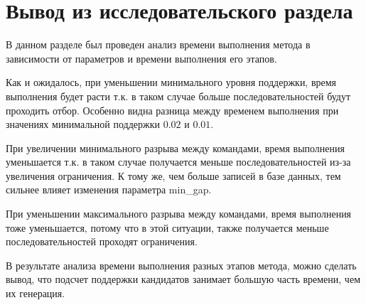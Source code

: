 \newpage
\section*{Вывод из исследовательского раздела}
В данном разделе был проведен анализ времени выполнения метода в зависимости от параметров и времени выполнения его этапов.

Как и ожидалось, при уменьшении минимального уровня поддержки, время выполнения будет расти т.к. в таком случае больше последовательностей будут проходить отбор. Особенно видна разница между временем выполнения при значениях минимальной поддержки $0.02$ и $0.01$.

При увеличении минимального разрыва между командами, время выполнения уменьшается т.к. в таком случае получается меньше последовательностей из-за увеличения ограничения. К тому же, чем больше записей в базе данных, тем сильнее влияет изменения параметра min\_gap.

При уменьшении максимального разрыва между командами, время выполнения тоже уменьшается, потому что в этой ситуации, также получается меньше последовательностей проходят ограничения.

В результате анализа времени выполнения разных этапов метода, можно сделать вывод, что подсчет поддержки кандидатов занимает большую часть времени, чем их генерация.